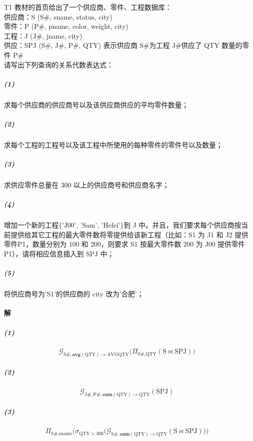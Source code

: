 \documentclass{article}
\makeatletter
\renewcommand{\section}{\@startsection{section}{1}{0mm}
                                {-5ex plus -.5ex minus -.2ex}
                                {3ex plus .2ex}
                                {\normalfont\large\bfseries}}
\makeatother
\begin{document}
\section{T1 教材的首页给出了一个供应商、零件、工程数据库：
\protect\\ \indent 供应商：S (S\#, sname, status, city)
\protect\\ \indent 零件：P (P\#, pname, color, weight, city)
\protect\\ \indent 工程：J (J\#, jname, city)
\protect\\ \indent 供应：SPJ (S\#, J\#, P\#, QTY) 表示供应商 S\#为工程 J\#供应了 QTY 数量的零件 P\#
\protect\\ 请写出下列查询的关系代数表达式：}
\subparagraph{(1)} 求每个供应商的供应商号以及该供应商供应的平均零件数量；
\subparagraph{(2)} 求每个工程的工程号以及该工程中所使用的每种零件的零件号以及数量；
\subparagraph{(3)} 求供应零件总量在 300 以上的供应商号和供应商名字；
\subparagraph{(4)} 增加一个新的工程$\{\text{'J00'},\, \text{'Sam'},\, \text{'Hefei'}\}$到 J 中。并且，我们要求每个供应商按当前提供给其它工程的最大零件数将零提供给该新工程（比如：S1 为 J1 和 J2 提供零件P1，数量分别为 100 和 200，则要求 S1 按最大零件数 200 为 J00 提供零件 P1），请将相应信息插入到 SPJ 中；
\subparagraph{(5)} 将供应商号为'S1'的供应商的 city 改为'合肥'；

\paragraph{解}
\subparagraph{(1)}
\begin{Large}
\begin{equation*}
    \mathcal{G}_{\text{S\#}, \textbf{avg}(\text{QTY}) \rightarrow \text{AVGQTY}}\big(\Pi_{\text{S\#}, \text{QTY}}(\text{S} \Join \text{SPJ})\big)
\end{equation*}
\end{Large}

\subparagraph{(2)}
\begin{Large}
\begin{equation*}
    \mathcal{G}_{\text{J\#}, \text{P\#}, \textbf{sum}(\text{QTY}) \rightarrow \text{QTY}}(\text{SPJ})
\end{equation*}
\end{Large}

\subparagraph{(3)}
\begin{Large}
\begin{equation*}
    \Pi_{\text{S\#}, \text{sname}}\Big(\sigma_{\text{QTY} > 300}\big(\mathcal{G}_{\text{S\#}, \textbf{sum}(\text{QTY}) \rightarrow \text{QTY}}(\text{S} \Join \text{SPJ})\big)\Big)
\end{equation*}
\end{Large}
\end{document}
